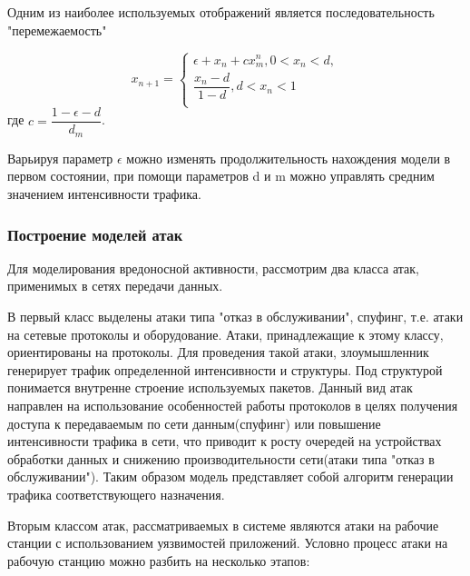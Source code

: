     Одним из наиболее используемых отображений является последовательность "перемежаемость"

    $$
        x_{n+1} = \left\{
                    \begin{aligned}
                        \epsilon + x_{n} + cx_{m}^{n}, 0 < x_{n} < d, \\
                        \dfrac{x_{n} - d}{1 - d}, d < x_{n} < 1\\
                    \end{aligned}
                  \right.
    $$
    где $c = \dfrac{1 - \epsilon - d}{d_{m}}$.

    Варьируя параметр $\epsilon$ можно изменять продолжительность нахождения модели в первом состоянии, при помощи параметров d и m можно управлять средним значением интенсивности трафика.

    \subsubsection{Построение моделей атак}

    Для моделирования вредоносной активности, рассмотрим два класса атак, применимых в сетях передачи данных.

    В первый класс выделены атаки типа "отказ в обслуживании", спуфинг, т.е. атаки на сетевые протоколы и оборудование. Атаки, принадлежащие к этому классу, ориентированы на протоколы. Для проведения такой атаки, злоумышленник генерирует трафик определенной интенсивности и структуры. Под структурой понимается внутренне строение используемых пакетов. Данный вид атак направлен на использование особенностей работы протоколов в целях получения доступа к передаваемым по сети данным(спуфинг) или повышение интенсивности трафика в сети, что приводит к росту очередей на устройствах обработки данных и снижению производительности сети(атаки типа "отказ в обслуживании"). Таким образом модель представляет собой алгоритм генерации трафика соответствующего назначения.

    Вторым классом атак, рассматриваемых в системе являются атаки на рабочие станции с использованием уязвимостей приложений. Условно процесс атаки на рабочую станцию можно разбить на несколько этапов:

